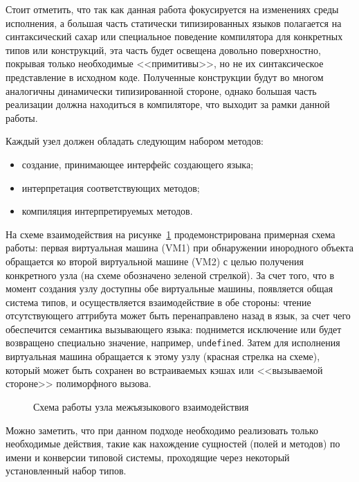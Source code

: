 \documentclass[times
]{itmo-student-thesis}
\begin{document}
Стоит отметить, что так как данная работа фокусируется на изменениях среды исполнения, а большая часть статически типизированных языков полагается на синтаксический сахар или специальное поведение компилятора для конкретных типов или конструкций, эта часть будет освещена довольно поверхностно, покрывая только необходимые <<примитивы>>, но не их синтаксическое представление в исходном коде. Полученные конструкции будут во многом аналогичны динамически типизированной стороне, однако большая часть реализации должна находиться в компиляторе, что выходит за рамки данной работы.

Каждый узел должен обладать следующим набором методов:
\begin{itemize}
	\item создание, принимающее интерфейс создающего языка;
	\item интерпретация соответствующих методов;
	\item компиляция интерпретируемых методов.
\end{itemize}

На схеме взаимодействия на рисунке~\ref{fig:create-interop-node} продемонстрирована примерная схема работы: первая виртуальная машина (VM1) при обнаружении инородного объекта обращается ко второй виртуальной машине (VM2) с целью получения конкретного узла (на схеме обозначено зеленой стрелкой). За счет того, что в момент создания узлу доступны обе виртуальные машины, появляется общая система типов, и осуществляется взаимодействие в обе стороны: чтение отсутствующего аттрибута может быть перенаправлено назад в язык, за счет чего обеспечится семантика вызывающего языка: поднимется исключение или будет возвращено специально значение, например, \texttt{undefined}. Затем для исполнения виртуальная машина обращается к этому узлу (красная стрелка на схеме), который может быть сохранен во встраиваемых кэшах или <<вызываемой стороне>> полиморфного вызова.
\begin{figure}[!h]
	\caption{Схема работы узла межъязыкового взаимодействия}\label{fig:create-interop-node}
	\centering
	
\end{figure}

Можно заметить, что при данном подходе необходимо реализовать только необходимые действия, такие как нахождение сущностей (полей и методов) по имени и конверсии типовой системы, проходящие через некоторый установленный набор типов.
\end{document}
